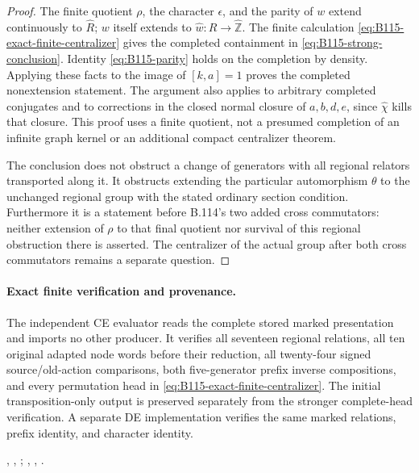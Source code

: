 \begin{proof}
The finite quotient $\rho$, the character $\epsilon$, and the parity
of $w$ extend continuously to $\widehat R$; $w$ itself extends to
$\widehat w:\widehat R\to\widehat{\mathbb Z}$. The finite
calculation \eqref{eq:B115-exact-finite-centralizer} gives
the completed containment in \eqref{eq:B115-strong-conclusion}.
Identity \eqref{eq:B115-parity} holds on the completion by density.
Applying these facts to the image of $[k,a]=1$ proves the completed
nonextension statement. The argument also applies to arbitrary
completed conjugates and to corrections in the closed normal closure
of $a,b,d,e$, since $\widehat\chi$ kills that closure. This proof
uses a finite quotient, not a presumed completion of an infinite
graph kernel or an additional compact centralizer theorem.

The conclusion does not obstruct a change of generators with all
regional relators transported along it. It obstructs extending the
particular automorphism $\theta$ to the unchanged regional group
with the stated ordinary section condition. Furthermore it is a
statement before B.114's two added cross commutators: neither
extension of $\rho$ to that final quotient nor survival of this
regional obstruction there is asserted. The centralizer of the
actual group after both cross commutators remains a separate question.
\end{proof}

\paragraph{Exact finite verification and provenance.}
The independent CE evaluator reads the complete stored marked
presentation and imports no other producer. It verifies all seventeen
regional relations, all ten original adapted node words before their
reduction, all twenty-four signed source/old-action comparisons, both
five-generator prefix inverse compositions, and every permutation
head in \eqref{eq:B115-exact-finite-centralizer}. The initial
transposition-only output is preserved separately from the stronger
complete-head verification. A separate DE implementation verifies the
same marked relations, prefix identity, and character identity.
\begingroup\raggedright
{},
,
;
,
,
.
\par\endgroup
